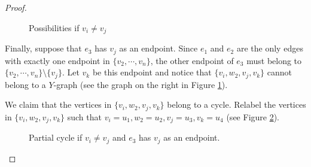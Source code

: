 \begin{proof}
\begin{figure}[h!]
        \quad\quad
        \caption{Possibilities if \(v_i \neq v_j\)}
        \label{fig:lem:is_surface_2_3}
    \end{figure}

    Finally, suppose that \(e_3\) has \(v_j\) as an endpoint. 
    Since \(e_1\) and \(e_2\) are the only edges with exactly one endpoint in \(\{v_2, \cdots, v_n\}\),
    the other endpoint of \(e_3\) must belong to \(\{v_2, \cdots, v_n\}\setminus\{v_j\}\).
    Let \(v_k\) be this endpoint and notice that \(\{v_i, w_2, v_j, v_k\}\) cannot belong to a \(Y\)-graph
    (see the graph on the right in Figure \ref{fig:lem:is_surface_2_3}).
    
    We claim that the vertices in \(\{v_i, w_2, v_j, v_k\}\) belong to a cycle.
    Relabel the vertices in \(\{v_i, w_2, v_j, v_k\}\) such that \(v_i = u_1, w_2 = u_2, v_j = u_3, v_k = u_4\) (see Figure \ref{fig:lem:is_surface_2_4}).
    \begin{figure}[h!]
        \centering
        \caption{Partial cycle if \(v_i \neq v_j\) and \(e_3\) has \(v_j\) as an endpoint.}
        \label{fig:lem:is_surface_2_4}
    \end{figure}


\end{proof}
